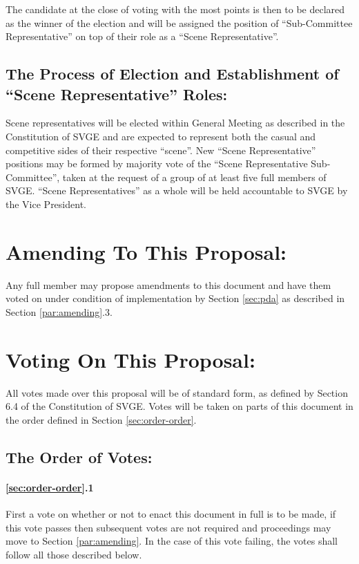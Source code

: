 \documentclass[10pt, a4paper]{article}
\begin{document}
The candidate at the close of voting with the most points is then to be declared as the winner of the election and will be assigned the position of ``Sub-Committee Representative'' on top of their role as a ``Scene Representative''.

\subsection{The Process of Election and Establishment of ``Scene Representative'' Roles:\label{sec:elect-em}}
Scene representatives will be elected within General Meeting as described in the Constitution of SVGE and are expected to represent both the casual and competitive sides of their respective ``scene''. New ``Scene Representative'' positions may be formed by majority vote of the ``Scene Representative Sub-Committee'', taken at the request of a group of at least five full members of SVGE. ``Scene Representatives'' as a whole will be held accountable to SVGE by the Vice President.

\section{Amending To This Proposal:\label{sec:amend}}
Any full member may propose amendments to this document and have them voted on under condition of implementation by Section \ref{sec:pda} as described in Section \ref{par:amending}.3.

\section{Voting On This Proposal:\label{sec:the-vote}}
All votes made over this proposal will be of standard form, as defined by Section 6.4 of the Constitution of SVGE. Votes will be taken on parts of this document in the order defined in Section \ref{sec:order-order}.

\subsection{The Order of Votes:\label{sec:order-order}}

\paragraph{\ref{sec:order-order}.1} First a vote on whether or not to enact this document in full is to be made, if this vote passes then subsequent votes are not required and proceedings may move to Section \ref{par:amending}. In the case of this vote failing, the votes shall follow all those described below.
\end{document}

